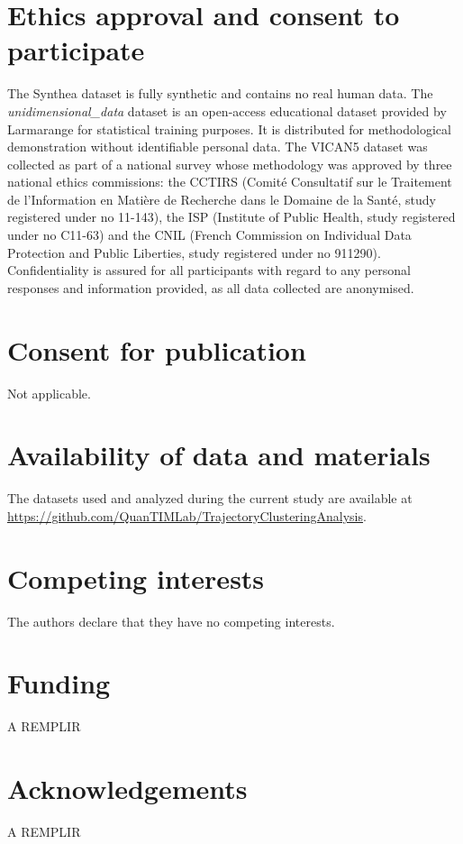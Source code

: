 \documentclass[a4paper]{cas-sc}
\begin{document}
\section*{Ethics approval and consent to participate}
The Synthea \citep{walonoski2020synthea} dataset is fully synthetic and contains no real human data.
The \textit{unidimensional\_data} dataset is an open-access educational dataset provided by Larmarange \citep{larmarange_analyseR} for statistical training purposes. It is distributed for methodological demonstration without identifiable personal data.
The VICAN5 \citep{Bouhnike005971} dataset was collected as part of a national survey whose methodology was approved by three national ethics commissions: 
the CCTIRS (Comité Consultatif sur le Traitement de l’Information en Matière de Recherche dans le Domaine de la Santé, study registered under no 11-143), 
the ISP (Institute of Public Health, study registered under no C11-63) 
and the CNIL (French Commission on Individual Data Protection and Public Liberties, study registered under no 911290). 
Confidentiality is assured for all participants with regard to any personal responses and information provided, as all data collected are anonymised.

\section*{Consent for publication}
Not applicable.

\section*{Availability of data and materials}
The datasets used and analyzed during the current study are available at \url{https://github.com/QuanTIMLab/TrajectoryClusteringAnalysis}.

\section*{Competing interests}
The authors declare that they have no competing interests.

\section*{Funding}
A REMPLIR

\section*{Acknowledgements}
A REMPLIR




\printcredits
\end{document}
